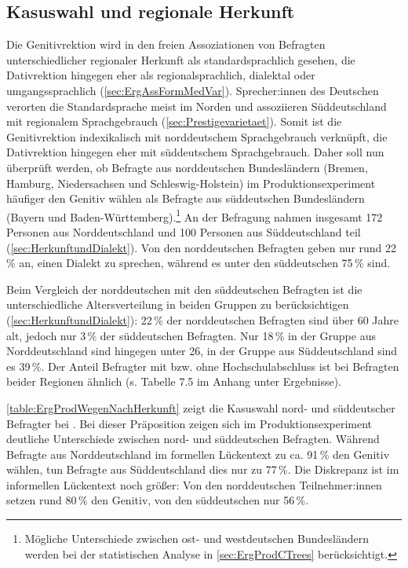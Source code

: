 \subsection{Kasuswahl und regionale Herkunft}
\label{sec:ErgProdNachHerkunft}
\largerpage
\begin{sloppypar}
Die Genitivrektion wird in den freien Assoziationen von Befragten unterschiedlicher regionaler Herkunft als standardsprachlich gesehen, die Dativrektion hingegen eher als regionalsprachlich, dialektal oder umgangssprachlich (\autoref{sec:ErgAssFormMedVar}). 
Sprecher:innen des Deutschen verorten die Standardsprache meist im Norden und assoziieren Süddeutschland mit regionalem Sprachgebrauch (\autoref{sec:Prestigevarietaet}). 
Somit ist die Genitivrektion indexikalisch mit norddeutschem Sprachgebrauch verknüpft, die Dativrektion hingegen eher mit süddeutschem Sprachgebrauch. 
Daher soll nun überprüft werden, ob Befragte aus norddeutschen Bundesländern (Bremen, Hamburg, Niedersachsen und Schleswig\hyp Holstein) im Produktionsexperiment häufiger den Genitiv wählen als Befragte aus süddeutschen Bundesländern (Bayern und Baden\hyp Württemberg).\footnote{Mögliche Unterschiede zwischen ost- und westdeutschen Bundesländern werden bei der statistischen Analyse in \autoref{sec:ErgProdCTrees} berücksichtigt.} 
An der Befragung nahmen insgesamt 172 Personen aus Norddeutschland und 100 Personen aus Süddeutschland teil (\autoref{sec:HerkunftundDialekt}). 
Von den norddeutschen Befragten geben nur rund 22\,\% an, einen Dialekt zu sprechen, während es unter den süddeutschen 75\,\% sind. 
\end{sloppypar}

Beim Vergleich der norddeutschen mit den süddeutschen Befragten ist die unterschiedliche Altersverteilung in beiden Gruppen zu berücksichtigen (\autoref{sec:HerkunftundDialekt}): 
22\,\% der norddeutschen Befragten sind über 60 Jahre alt, jedoch nur 3\,\% der süddeutschen Befragten. 
Nur 18\,\% in der Gruppe aus Norddeutschland sind hingegen unter 26, in der Gruppe aus Süddeutschland sind es 39\,\%. 
Der Anteil Befragter mit bzw. ohne Hochschulabschluss ist bei Befragten beider Regionen ähnlich (s. Tabelle 7.5 im Anhang unter Ergebnisse). 

\autoref{table:ErgProdWegenNachHerkunft} zeigt die Kasuswahl nord- und süddeutscher Befragter bei \wegen.
Bei dieser Präposition zeigen sich im Produktionsexperiment deutliche Unterschiede zwischen nord- und süddeutschen Befragten.
Während Befragte aus Norddeutschland im formellen Lückentext zu ca. 91\,\% den Genitiv wählen, tun Befragte aus Süddeutschland dies nur zu 77\,\%. 
Die Diskrepanz ist im informellen Lückentext noch größer: 
Von den norddeutschen Teilnehmer:innen setzen rund 80\,\% den Genitiv, von den süddeutschen nur 56\,\%.

